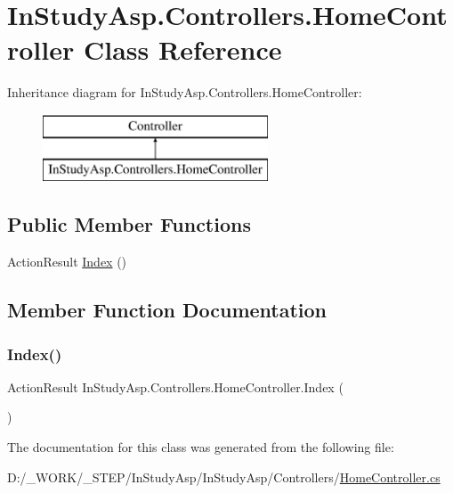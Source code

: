 \hypertarget{class_in_study_asp_1_1_controllers_1_1_home_controller}{}\section{In\+Study\+Asp.\+Controllers.\+Home\+Controller Class Reference}
\label{class_in_study_asp_1_1_controllers_1_1_home_controller}
Inheritance diagram for In\+Study\+Asp.\+Controllers.\+Home\+Controller\+:\begin{figure}[H]
\begin{center}
\leavevmode
\includegraphics[height=2.000000cm]{class_in_study_asp_1_1_controllers_1_1_home_controller}
\end{center}
\end{figure}
\subsection*{Public Member Functions}
\begin{DoxyCompactItemize}
\item 
Action\+Result \hyperlink{class_in_study_asp_1_1_controllers_1_1_home_controller_a15eec3973e09a36299920ddd2a4af067}{Index} ()
\end{DoxyCompactItemize}


\subsection{Member Function Documentation}
\mbox{\label{class_in_study_asp_1_1_controllers_1_1_home_controller_a15eec3973e09a36299920ddd2a4af067}} 
\subsubsection{\texorpdfstring{Index()}{Index()}}
{\footnotesize\ttfamily Action\+Result In\+Study\+Asp.\+Controllers.\+Home\+Controller.\+Index (\begin{DoxyParamCaption}{ }\end{DoxyParamCaption})}



The documentation for this class was generated from the following file\+:\begin{DoxyCompactItemize}
\item 
D\+:/\+\_\+\+W\+O\+R\+K/\+\_\+\+S\+T\+E\+P/\+In\+Study\+Asp/\+In\+Study\+Asp/\+Controllers/\hyperlink{_home_controller_8cs}{Home\+Controller.\+cs}\end{DoxyCompactItemize}

